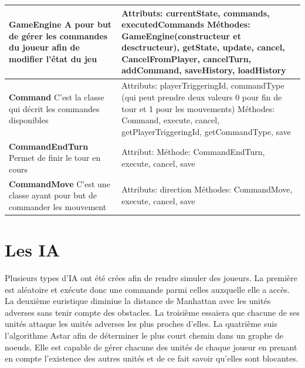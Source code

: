 \newpage

\phantom{Texte invisible parce que j'ai pas trouvé d'autre méthode pour mettre le tableau à la ligne.}

\begin{tabularx}{15 cm}{|X|X|}
\hline
\textbf{GameEngine} \newline A pour but de gérer les commandes du joueur afin de modifier l'état du jeu & Attributs: currentState, commands, executedCommands \newline Méthodes: GameEngine(constructeur et desctructeur), getState, update, cancel, CancelFromPlayer, cancelTurn, addCommand, saveHistory, loadHistory\\ 
\hline
\textbf{Command} \newline C'est la classe qui décrit les commandes disponibles  & Attributs: playerTriggeringId, commandType (qui peut prendre deux valeurs 0 pour fin de tour et 1 pour les mouvements) \newline Méthodes: Command, execute, cancel, getPlayerTriggeringId, getCommandType, save\\
\hline
\textbf{CommandEndTurn} \newline Permet de finir le tour en cours & Attribut:  \newline Méthode: CommandEndTurn, execute, cancel, save\\
\hline
\textbf{CommandMove} \newline C'est une classe ayant pour but de commander les mouvement & Attributs: direction
\newline Méthodes: CommandMove, execute, cancel, save\\
\hline

\end{tabularx}

\newpage



\section{Les IA}

Plusieurs types d'IA ont été crées afin de rendre simuler des joueurs.\newline
La première est aléatoire et exécute donc une commande parmi celles auxquelle elle a accès.\newline
La deuxième euristique diminiue la distance de Manhattan avec les unités adverses sans tenir compte des obstacles.\newline
La troisième essaiera que chacune de ses unités attaque les unités adverses les plus proches d'elles. \newline
La quatrième suis l'algorithme Astar afin de déterminer le plus court chemin dans un graphe de noeuds. Elle est capable de gérer chacune des unités de chaque joueur en prenant en compte l'existence des autres unités et de ce fait savoir qu'elles sont blocantes.


